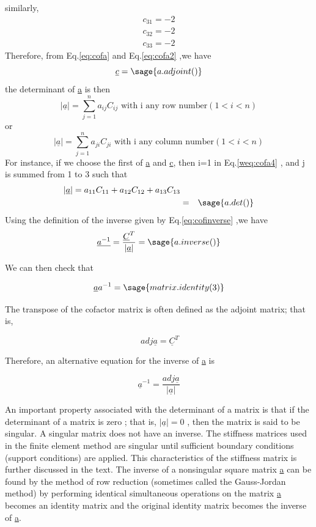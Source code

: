 \documentclass[12pt]{report}
\newcommand{\lab}[1]{
Eq.\ref{#1}
}
\begin{document}
similarly,
\begin{eqnarray} c_{31} = -2 \nonumber \\ c_{32} = -2 \nonumber \\c_{33} = -2 \label{eq:cofa2}\end{eqnarray}
Therefore, from \lab{eq:cofa} and \lab{eq:cofa2} ,we have 
\begin{equation} \underline{c} = \sage{a.adjoint()}\end{equation}
the determinant of \underline{a} is then 
\begin{equation}{|\underline{a}|}=\sum_{j=1}^{n}a_{ij}C_{ij} \text{ with i any row
number} (1 < i < n)\label{weq:cofa4}\end{equation}
or
\begin{equation}{|\underline{a}|}=\sum_{j=1}^{n}a_{ji}C_{ji} \text{ with i any column
number}(1 < i < n) \end{equation} 
For instance, if we choose the first of \underline{a} and \underline{c}, then i=1
in \lab{weq:cofa4}, and j is summed from 1 to 3 such that
\begin{eqnarray}|\underline{a}|=a_{11}C_{11}+a_{12}C_{12}+a_{13}C_{13} \nonumber \\ & = & \sage{a.det()}\end{eqnarray}
Using the definition of the inverse given by \lab{eq:cofinverse},we have
\begin{equation} \underline{a^{-1}}=\frac{\underline{C}^T}{|\underline{a}|}=\sage{a.inverse()} \end{equation}

We can then check that

\begin{equation}\underline{a}{a}^{-1}=\sage{matrix.identity(3)}\end{equation}


The transpose of the cofactor matrix is often defined as the adjoint
matrix; that is,

\begin{equation}\ adj\underline{a}=\underline{C}^T \end{equation}

Therefore, an alternative equation for the inverse of \underline{a} is


\begin{equation}\underline{a}^{-1}=\frac {adj \underline{a}}{|\underline{a}|}\end{equation}


An important property associated with the determinant of a matrix is
that if the determinant of a matrix is zero ; that is,
$|\underline{a}| =0$ , then the matrix is said to be singular. A
singular matrix does not have an inverse. The stiffness matrices used
in the finite element method are singular until sufficient boundary
conditions (support conditions) are applied. This characteristics of
the stiffness matrix is further discussed in the text.
The inverse of a nonsingular square matrix \underline{a} can be found
by the method of row reduction (sometimes called the Gauss-Jordan
method) by performing identical simultaneous operations on the matrix
\underline{a} becomes an identity matrix and the original identity
matrix becomes the inverse of \underline{a}.
\end{document}
